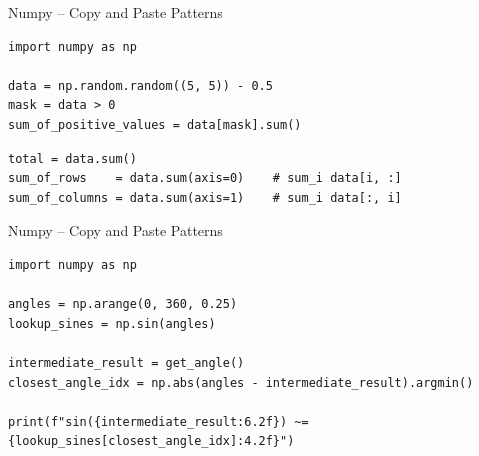 

\begin{frame}[fragile]{Numpy -- Copy and Paste Patterns}
%
\begin{codebox}
\begin{verbatim}
import numpy as np

data = np.random.random((5, 5)) - 0.5
mask = data > 0
sum_of_positive_values = data[mask].sum()
\end{verbatim}
\end{codebox}
%
\begin{codebox}
\begin{verbatim}
total = data.sum()
sum_of_rows    = data.sum(axis=0)    # sum_i data[i, :]
sum_of_columns = data.sum(axis=1)    # sum_i data[:, i]
\end{verbatim}
\end{codebox}
%
\end{frame}


\begin{frame}[fragile]{Numpy -- Copy and Paste Patterns}
%
\begin{codebox}
\begin{verbatim}
import numpy as np

angles = np.arange(0, 360, 0.25)
lookup_sines = np.sin(angles)

intermediate_result = get_angle()
closest_angle_idx = np.abs(angles - intermediate_result).argmin()

print(f"sin({intermediate_result:6.2f}) ~= {lookup_sines[closest_angle_idx]:4.2f}")
\end{verbatim}
\end{codebox}
%
\end{frame}


